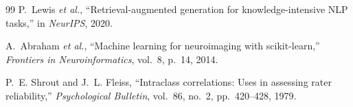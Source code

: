 \documentclass[journal]{IEEEtran}
\begin{document}
\begin{thebibliography}{99}
P.~Lewis \textit{et al.}, ``Retrieval-augmented generation for
knowledge-intensive NLP tasks,'' in \textit{NeurIPS}, 2020.

A.~Abraham \textit{et al.}, ``Machine learning for neuroimaging with
scikit-learn,'' \textit{Frontiers in Neuroinformatics}, vol.~8, p.~14,
2014.

P.~E. Shrout and J.~L. Fleiss, ``Intraclass correlations: Uses in
assessing rater reliability,'' \textit{Psychological Bulletin}, vol.~86,
no.~2, pp.~420--428, 1979.

\end{thebibliography}
\end{document}
